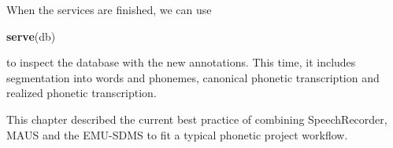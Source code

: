\documentclass[]{book}
\newenvironment{Shaded}{\begin{snugshade}}{\end{snugshade}}
\newcommand{\KeywordTok}[1]{\textcolor[rgb]{0.13,0.29,0.53}{\textbf{{#1}}}}
\newcommand{\NormalTok}[1]{{#1}}
\theoremstyle{definition}
\theoremstyle{definition}
\theoremstyle{definition}
\theoremstyle{remark}
\begin{document}
When the services are finished, we can use

\begin{Shaded}
\begin{Highlighting}[]
\KeywordTok{serve}\NormalTok{(db)}
\end{Highlighting}
\end{Shaded}

to inspect the database with the new annotations. This time, it includes
segmentation into words and phonemes, canonical phonetic transcription
and realized phonetic transcription.

This chapter described the current best practice of combining
SpeechRecorder, MAUS and the EMU-SDMS to fit a typical phonetic project
workflow.


\end{document}
